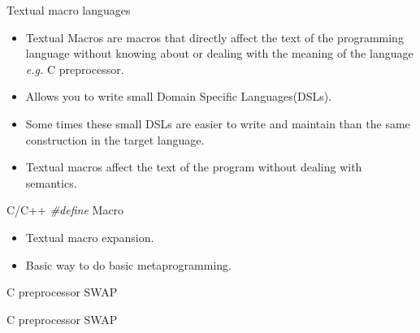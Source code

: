 \begin{frame}{Textual macro languages}
    \begin{itemize}
        \item Textual Macros are macros that directly affect the text of the 
            programming language without knowing about or dealing with the 
            meaning of the language \emph{e.g.} C preprocessor\cite{macrosibm}. 

        \item Allows you to write small Domain Specific Languages(DSLs).

        \item Some times these small DSLs are easier to write and maintain than
            the same construction in the target language.

        \item Textual macros affect the text of the program without dealing 
            with semantics.
    \end{itemize}
\end{frame}

\begin{frame}{C/C++ \emph{\#define} Macro}
    \begin{itemize}\addtolength{\itemsep}{1\baselineskip}
        \item Textual macro expansion.

        \item Basic way to do basic metaprogramming.
    \end{itemize}
\end{frame}

\begin{frame}{C preprocessor SWAP}
    \begin{center}
    \end{center}
\end{frame}

\begin{frame}{C preprocessor SWAP}
    \begin{center}
    \end{center}
\end{frame}

